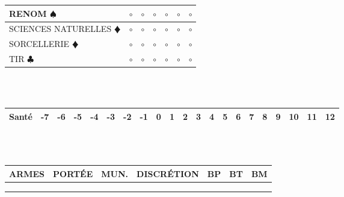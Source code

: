 \documentclass[a5paper]{letter}
\begin{document}
{{\begin{tabular}[c]{|p{}|p{}|p{}|p{}|p{}|p{}|p{}|}
	RENOM { $\spadesuit$ }								&	$\circ$	&	$\circ$	&	$\circ$	&	$\circ$	&	$\circ$		&	$\circ$		\\ \hline
	SCIENCES NATURELLES {\color{red} $\vardiamond$ }	&	$\circ$	&	$\circ$	&	$\circ$	&	$\circ$	&	$\circ$		&	$\circ$		\\ \hline
	SORCELLERIE {\color{red} $\vardiamond$ }			&	$\circ$	&	$\circ$	&	$\circ$	&	$\circ$	&	$\circ$		&	$\circ$		\\ \hline
	TIR { $\clubsuit$ }									&	$\circ$	&	$\circ$	&	$\circ$	&	$\circ$	&	$\circ$		&	$\circ$		\\ \hline
\end{tabular}~\\~\\

\begin{tabular}[c]{|p{}|c|c|c|c|c|c|c|c|c|c|c|c|c|c|c|c|c|c|c|c|}
	\hline
	\textbf{Santé}	&	-7	&	-6	&	-5	&	-4	&	-3	&	-2	&	-1	&	0	&	1	&	2	&	3	&	4	&	5	&	6	&	7	&	8	&	9	&	10	&	11	&	12	\\
	\hline
\end{tabular}~\\~\\

\begin{tabular}[c]{|p{}|p{}|p{}|p{}|p{}|p{}|p{}|} 
	\hline
	\textbf{ARMES}	&	PORTÉE	&	MUN.	&	DISCRÉTION	&	BP	&	BT	&	BM	\\
	\hline
					&			&			&				&		&		&		\\
	\hline
					&			&			&				&		&		&		\\
	\hline
					&			&			&				&		&		&		\\
	\hline
\end{tabular}

~\\~\\~\\


}}
\end{document}
